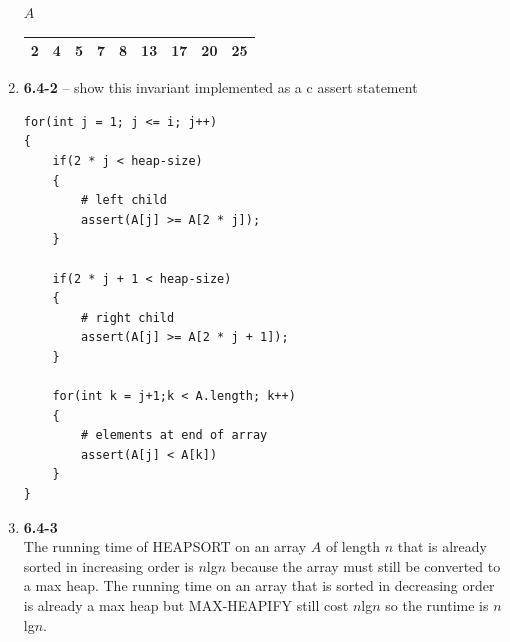 \documentclass[a4paper]{article}
\begin{document}
\begin{enumerate}
        \begin{center}
            $A$
            \begin{tabular}{ |c|c|c|c|c|c|c|c|c| } \hline
                2 & 4 & 5 & 7 & 8 & 13 & 17 & 20 & 25 \\ \hline
            \end{tabular}
        \end{center}

        \newpage
        \item 
        \textbf{6.4-2} – show this invariant implemented as a c assert statement
        \begin{verbatim}
for(int j = 1; j <= i; j++)
{
    if(2 * j < heap-size)
    {    
        # left child
        assert(A[j] >= A[2 * j]);
    }
    
    if(2 * j + 1 < heap-size)
    {
        # right child
        assert(A[j] >= A[2 * j + 1]);
    }

    for(int k = j+1;k < A.length; k++)
    {
        # elements at end of array
        assert(A[j] < A[k])
    }
}
        \end{verbatim}

        \item 
        \textbf{6.4-3} \\
        The running time of HEAPSORT on an array $A$ of length $n$ that is already
        sorted in increasing order is $n$lg$n$ because the array must still be 
        converted to a max heap. The running time on an array that is sorted in 
        decreasing order is already a max heap but MAX-HEAPIFY still cost $n$lg$n$
        so the runtime is $n$lg$n$.

    \end{enumerate}
\end{document}
